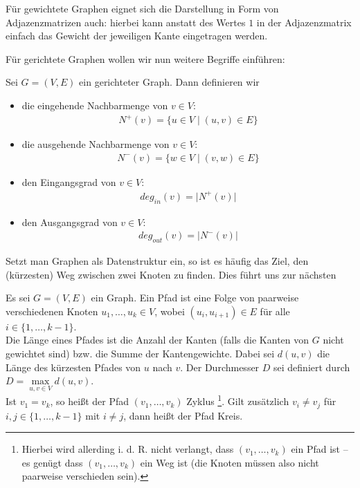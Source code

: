 Für gewichtete Graphen eignet sich die Darstellung in Form von Adjazenzmatrizen auch: hierbei kann anstatt des Wertes $1$ in der Adjazenzmatrix einfach das Gewicht der jeweiligen Kante eingetragen werden.

Für gerichtete Graphen wollen wir nun weitere Begriffe einführen:

\begin{defi}
	Sei $G=(V,E)$ ein gerichteter Graph. Dann definieren wir
	\begin{itemize}
		\item die eingehende Nachbarmenge von $v \in V$:
		\begin{gather*}
			N^{+}(v) = \{u \in V \mid (u,v) \in E \}
		\end{gather*}

		\item die ausgehende Nachbarmenge von $v \in V$:
		\begin{gather*}
			N^{-}(v) = \{w \in V \mid (v,w) \in E \}
		\end{gather*}

		\item den Eingangsgrad von $v \in V$:
		\begin{gather*}
			deg_{in}(v) = \big| N^{+}(v) \big|
		\end{gather*}

		\item den Ausgangsgrad von $v \in V$:
		\begin{gather*}
			deg_{out}(v) = \big| N^{-}(v) \big|
		\end{gather*}
	\end{itemize}
\end{defi}

Setzt man Graphen als Datenstruktur ein, so ist es häufig das Ziel, den (kürzesten) Weg zwischen zwei Knoten zu finden. Dies führt uns zur nächsten

\begin{defi}[Pfade]
	Es sei $G=(V,E)$ ein Graph. Ein Pfad ist eine Folge von paarweise verschiedenen Knoten $u_1, \dots, u_k \in V$, wobei $(u_i, u_{i+1}) \in E$ für alle $i \in \{1, \dots, k-1\}$. \\

	Die Länge eines Pfades ist die Anzahl der Kanten (falls die Kanten von $G$ nicht gewichtet sind) bzw. die Summe der Kantengewichte. Dabei sei $d(u,v)$ die Länge des kürzesten Pfades von $u$ nach $v$. Der Durchmesser $D$ sei definiert durch $D = \underset{u,v \in V}{\max}{d(u,v)}$. \\

	Ist $v_1 = v_k$, so heißt der Pfad $(v_1, \dots, v_k)$ Zyklus \footnote{Hierbei wird allerding i. d. R. nicht verlangt, dass $(v_1, \dots, v_k)$ ein Pfad ist -- es genügt dass $(v_1, \dots, v_k)$ ein Weg ist (die Knoten müssen also nicht paarweise verschieden sein).}. Gilt zusätzlich $v_i \neq v_j$ für $i,j \in \{1, \dots, k-1\}$ mit $i \neq j$, dann heißt der Pfad Kreis.
\end{defi}

